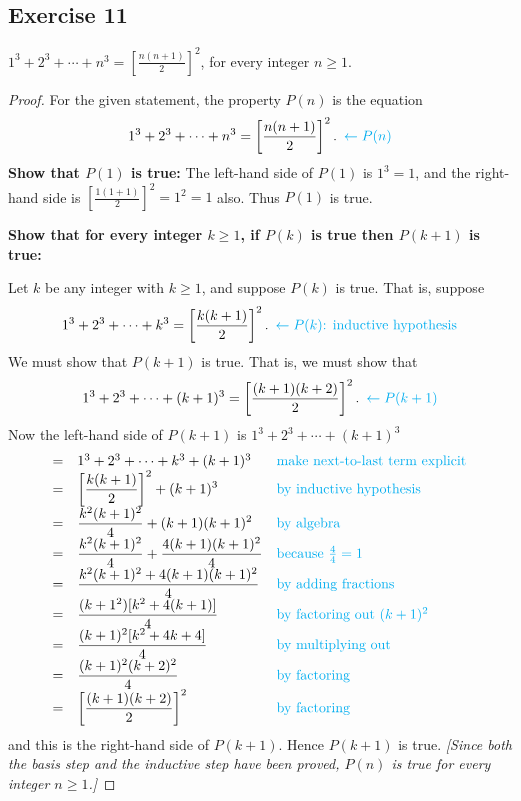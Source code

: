 \documentclass[14pt]{extarticle}
\newcommand{\dps}{\displaystyle}
\newcommand{\from}{\leftarrow}
\newcommand{\cy}{\color{cyan}}
\begin{document}
\subsection{Exercise 11}
$\dps 1^3 + 2^3 + \cdots + n^3 = \left[\frac{n(n+1)}{2}\right]^2$, for every integer $n \geq 1$.

\begin{proof}
For the given statement, the property $P(n)$ is the equation
\[
\dps 1^3 + 2^3 + \cdots + n^3 = \left[\frac{n(n+1)}{2}\right]^2. \,\,\, {\cy \from P(n)}
\]
{\bf Show that $P(1)$ is true:} The left-hand side of $P(1)$ is $1^3 = 1$, and the right-hand side is $\dps \left[ \frac{1(1+1)}{2}\right]^2 = 1^2 = 1$ also. Thus $P(1)$ is true.

{\bf Show that for every integer $k \geq 1$, if $P(k)$ is true then $P(k + 1)$ is true:}

Let $k$ be any integer with $k \geq 1$, and suppose $P(k)$ is true. That is, suppose
\[
\dps 1^3 + 2^3 + \cdots + k^3 = \left[\frac{k(k+1)}{2}\right]^2. \,\,\, {\cy \from P(k) \text{: inductive hypothesis}}
\]
We must show that $P(k + 1)$ is true. That is, we must show that
\[
\dps 1^3 + 2^3 + \cdots + (k+1)^3 = \left[\frac{(k+1)(k+2)}{2}\right]^2. \,\,\,{\cy \from P(k+1)}
\]
Now the left-hand side of $P(k + 1)$ is $1^3 + 2^3 + \cdots + (k+1)^3$
\[
\begin{array}{lll}
= & 1^3 + 2^3 + \cdots + k^3+ (k+1)^3 & \text{\cy make next-to-last term explicit} \\
= & \dps \left[\frac{k(k+1)}{2}\right]^2 + (k+1)^3 & \text{\cy by inductive hypothesis} \\
= & \dps \frac{k^2(k+1)^2}{4} + (k+1)(k+1)^2 & \text{\cy by algebra} \\
= & \dps \frac{k^2(k+1)^2}{4} + \frac{4(k+1)(k+1)^2}{4} & \text{\cy because $\frac{4}{4} = 1$} \\
= & \dps \frac{k^2(k+1)^2 + 4(k+1)(k+1)^2}{4} & \text{\cy by adding fractions} \\
= & \dps \frac{(k+1^2)[k^2 + 4(k+1)]}{4} & \text{\cy by factoring out $(k+1)^2$}  \\
= & \dps \frac{(k+1)^2[k^2+4k+4]}{4} & \text{\cy by multiplying out} \\
= & \dps \frac{(k+1)^2(k+2)^2}{4} & \text{\cy by factoring} \\
= & \dps \left[\frac{(k+1)(k+2)}{2}\right]^2 & \text{\cy by factoring}
\end{array}
\]
and this is the right-hand side of $P(k + 1)$. Hence $P(k + 1)$ is true. {\it [Since both the basis step and the inductive step have been proved, $P(n)$ is true for every integer $n \geq 1$.]}
\end{proof}
\end{document}
